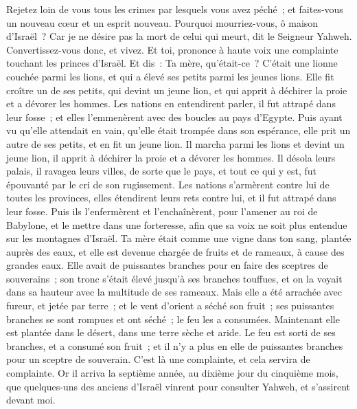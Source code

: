 \begin{multicols}{2}
Rejetez loin de vous tous les crimes par lesquels vous avez péché~; et faites-vous un nouveau cœur et un esprit nouveau. Pourquoi mourriez-vous, ô maison d'Israël~?
Car je ne désire pas la mort de celui qui meurt, dit le Seigneur Yahweh. Convertissez-vous donc, et vivez.
\VerseOne{}Et toi, prononce à haute voix une complainte touchant les princes d'Israël.
Et dis~: Ta mère, qu'était-ce~? C'était une lionne couchée parmi les lions, et qui a élevé ses petits parmi les jeunes lions.
Elle fit croître un de ses petits, qui devint un jeune lion, et qui apprit à déchirer la proie et a dévorer les hommes.
Les nations en entendirent parler, il fut attrapé dans leur fosse~; et elles l'emmenèrent avec des boucles au pays d'Egypte.
Puis ayant vu qu'elle attendait en vain, qu'elle était trompée dans son espérance, elle prit un autre de ses petits, et en fit un jeune lion.
Il marcha parmi les lions et devint un jeune lion, il apprit à déchirer la proie et a dévorer les hommes.
Il désola leurs palais, il ravagea leurs villes, de sorte que le pays, et tout ce qui y est, fut épouvanté par le cri de son rugissement.
Les nations s'armèrent contre lui de toutes les provinces, elles étendirent leurs rets contre lui, et il fut attrapé dans leur fosse.
Puis ils l'enfermèrent et l'enchaînèrent, pour l'amener au roi de Babylone, et le mettre dans une forteresse, afin que sa voix ne soit plus entendue sur les montagnes d'Israël.
Ta mère était comme une vigne dans ton sang, plantée auprès des eaux, et elle est devenue chargée de fruits et de rameaux, à cause des grandes eaux.
Elle avait de puissantes branches pour en faire des sceptres de souverains~; son tronc s'était élevé jusqu'à ses branches touffues, et on la voyait dans sa hauteur avec la multitude de ses rameaux.
Mais elle a été arrachée avec fureur, et jetée par terre~; et le vent d'orient a séché son fruit~; ses puissantes branches se sont rompues et ont séché~; le feu les a consumées.
Maintenant elle est plantée dans le désert, dans une terre sèche et aride.
Le feu est sorti de ses branches, et a consumé son fruit~; et il n'y a plus en elle de puissantes branches pour un sceptre de souverain. C'est là une complainte, et cela servira de complainte.
\VerseOne{}Or il arriva la septième année, au dixième jour du cinquième mois, que quelques-uns des anciens d'Israël vinrent pour consulter Yahweh, et s'assirent devant moi.

\end{multicols}
